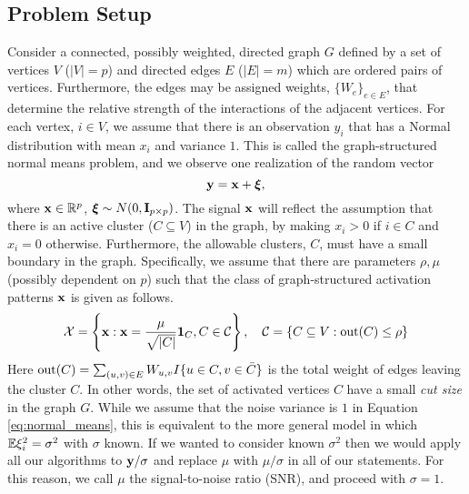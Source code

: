\subsection{Problem Setup}
\vspace{-.1cm}
Consider a connected, possibly weighted, directed graph $G$ defined by a set of vertices $V$ ($|V| = p$) and directed edges $E$ ($|E| = m$) which are ordered pairs of vertices.
Furthermore, the edges may be assigned weights, $\{ W_e \}_{e \in E}$, that determine the relative strength of the interactions of the adjacent vertices.
For each vertex, $i \in V$, we assume that there is an observation $y_i$ that has a Normal distribution with mean $x_i$ and variance $1$.
This is called the graph-structured normal means problem, and we observe one realization of the random vector
\begin{equation}
\label{eq:normal_means}
\mathbf{y} = \mathbf{x} + \bm{\xi},
\end{equation}
where $\mathbf{x} \in \mathbb{R}^p$, $\bm{\xi} \sim N(0,\mathbf{I}_{p\times p})$.
The signal $\mathbf{x}$ will reflect the assumption that there is an active cluster ($C \subseteq V$) in the graph, by making $x_i > 0$ if $i \in C$ and $x_i = 0$ otherwise. 
Furthermore, the allowable clusters, $C$, must have a small boundary in the graph.
Specifically, we assume that there are parameters $\rho, \mu$ (possibly
dependent on $p$) such that the class of graph-structured activation patterns
$\mathbf{x}$ is given as follows.
\[
\mathcal{X} = \left\{\mathbf{x} : \mathbf{x} = \frac {\mu}{\sqrt{|C|}} {\bf 1}_C, C \in \mathcal{C}\right\}, \quad \mathcal{C} = \left\{ C \subseteq V : \textrm{out}(C) \le \rho \right\}
\]
Here $\textrm{out}(C) = \sum_{(u,v)\in E} W_{u,v} I\{ u \in C, v \in \bar C \}$ is the total weight of edges leaving the cluster $C$.
In other words, the set of activated vertices $C$ have a small {\em cut size} in the graph $G$.
While we assume that the noise variance is $1$ in Equation \eqref{eq:normal_means}, this is equivalent to the more general model in which $\mathbb{E} \xi_i^2 = \sigma^2$ with $\sigma$ known.
If we wanted to consider known $\sigma^2$ then we would apply all our algorithms to $\mathbf{y} / \sigma$ and replace $\mu$ with $\mu / \sigma$ in all of our statements.
For this reason, we call $\mu$ the signal-to-noise ratio (SNR), and proceed with $\sigma = 1$.

